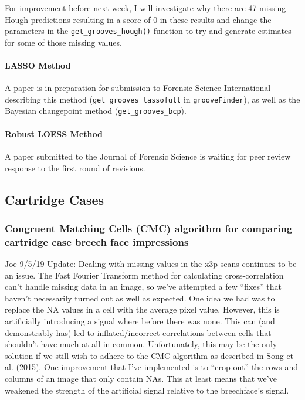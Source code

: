 \documentclass[]{book}
\let\oldparagraph\paragraph
\renewcommand{\paragraph}[1]{\oldparagraph{#1}\mbox{}}
\begin{document}
For improvement before next week, I will investigate why there are 47 missing Hough
predictions resulting in a score of 0 in these results and change the parameters in the
\texttt{get\_grooves\_hough()} function to try and generate estimates for some of those missing values.

\hypertarget{lasso-method}{%
\paragraph{LASSO Method}\label{lasso-method}}

A paper is in preparation for submission to Forensic Science International describing this method (\texttt{get\_grooves\_lassofull} in \texttt{grooveFinder}), as well as the Bayesian changepoint method (\texttt{get\_grooves\_bcp}).

\hypertarget{robust-loess-method}{%
\paragraph{Robust LOESS Method}\label{robust-loess-method}}

A paper submitted to the Journal of Forensic Science is waiting for peer review response to the first round of revisions.

\hypertarget{cartridge-cases}{%
\subsection{Cartridge Cases}\label{cartridge-cases}}

\hypertarget{congruent-matching-cells-cmc-algorithm-for-comparing-cartridge-case-breech-face-impressions}{%
\subsubsection{Congruent Matching Cells (CMC) algorithm for comparing cartridge case breech face impressions}\label{congruent-matching-cells-cmc-algorithm-for-comparing-cartridge-case-breech-face-impressions}}

Joe 9/5/19 Update: Dealing with missing values in the x3p scans continues to be an issue. The Fast Fourier Transform method for calculating cross-correlation can't handle missing data in an image, so we've attempted a few ``fixes'' that haven't necessarily turned out as well as expected. One idea we had was to replace the NA values in a cell with the average pixel value. However, this is artificially introducing a signal where before there was none. This can (and demonstrably has) led to inflated/incorrect correlations between cells that shouldn't have much at all in common. Unfortunately, this may be the only solution if we still wish to adhere to the CMC algorithm as described in Song et al. (2015). One improvement that I've implemented is to ``crop out'' the rows and columns of an image that only contain NAs. This at least means that we've weakened the strength of the artificial signal relative to the breechface's signal.
\end{document}
